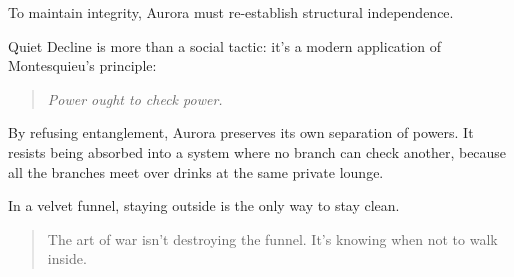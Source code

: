 To maintain integrity, Aurora must re-establish structural independence.

Quiet Decline is more than a social tactic: it’s a modern application of Montesquieu’s principle:

\begin{quote}
\textit{Power ought to check power.}
\end{quote}

By refusing entanglement, Aurora preserves its own separation of powers. It resists being absorbed into a system where no branch can check another, because all the branches meet over drinks at the same private lounge.

In a velvet funnel, staying outside is the only way to stay clean.

\begin{quote}
  The art of war isn’t destroying the funnel.  It’s knowing when not to walk inside.
\end{quote}

